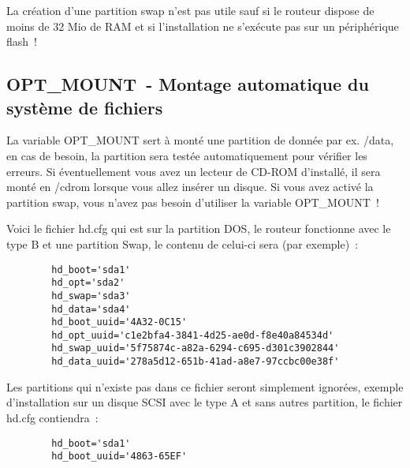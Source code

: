     La création d'une partition swap n'est pas utile sauf si le routeur 
    dispose de moins de 32 Mio de RAM et si l'installation ne s'exécute pas sur
    un périphérique flash~!

\subsection {OPT\_MOUNT~- Montage automatique du système de fichiers}

    La variable OPT\_MOUNT sert à monté une partition de donnée par ex. /data, en
    cas de besoin, la partition sera testée automatiquement pour vérifier les erreurs.
    Si éventuellement vous avez un lecteur de CD-ROM d'installé, il sera monté en
    /cdrom lorsque vous allez insérer un disque. Si vous avez activé la partition
    swap, vous n'avez pas besoin d'utiliser la variable OPT\_MOUNT~!



    Voici le fichier hd.cfg qui est sur la partition DOS, le routeur fonctionne
    avec le type B et une partition Swap, le contenu de celui-ci sera (par exemple)~:
    \begin{verbatim}
        hd_boot='sda1'
        hd_opt='sda2'
        hd_swap='sda3'
        hd_data='sda4'
        hd_boot_uuid='4A32-0C15'
        hd_opt_uuid='c1e2bfa4-3841-4d25-ae0d-f8e40a84534d'
        hd_swap_uuid='5f75874c-a82a-6294-c695-d301c3902844'
        hd_data_uuid='278a5d12-651b-41ad-a8e7-97ccbc00e38f'
    \end{verbatim}

    Les partitions qui n'existe pas dans ce fichier seront simplement ignorées,
    exemple d'installation sur un disque SCSI avec le type A et sans autres
    partition, le fichier hd.cfg contiendra~:
    \begin{verbatim}
        hd_boot='sda1'
        hd_boot_uuid='4863-65EF'
     \end{verbatim}


